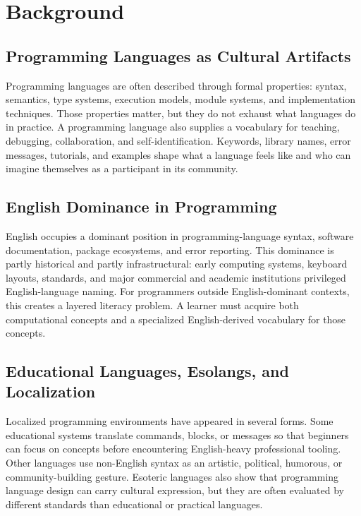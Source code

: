 \section{Background}

\subsection{Programming Languages as Cultural Artifacts}

Programming languages are often described through formal properties: syntax,
semantics, type systems, execution models, module systems, and implementation
techniques. Those properties matter, but they do not exhaust what languages do
in practice. A programming language also supplies a vocabulary for teaching,
debugging, collaboration, and self-identification. Keywords, library names,
error messages, tutorials, and examples shape what a language feels like and
who can imagine themselves as a participant in its community.


\subsection{English Dominance in Programming}

English occupies a dominant position in programming-language syntax, software
documentation, package ecosystems, and error reporting. This dominance is
partly historical and partly infrastructural: early computing systems,
keyboard layouts, standards, and major commercial and academic institutions
privileged English-language naming. For programmers outside English-dominant
contexts, this creates a layered literacy problem. A learner must acquire both
computational concepts and a specialized English-derived vocabulary for those
concepts.


\subsection{Educational Languages, Esolangs, and Localization}

Localized programming environments have appeared in several forms. Some
educational systems translate commands, blocks, or messages so that beginners
can focus on concepts before encountering English-heavy professional tooling.
Other languages use non-English syntax as an artistic, political, humorous, or
community-building gesture. Esoteric languages also show that programming
language design can carry cultural expression, but they are often evaluated by
different standards than educational or practical languages.

